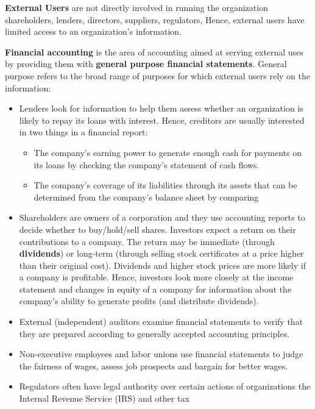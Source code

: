 \documentclass[../main.tex]{subfiles}
\begin{document}
	\textbf{External Users} are not directly involved in running the 
	organization \eg shareholders, lenders, directors, suppliers, regulators, 
	\etc Hence, external users have limited access to an organization's 
	information.
	
	\textbf{Financial accounting} is the area of accounting aimed at serving 
	external uses by providing them with \textbf{general purpose financial 
	statements}. General purpose refers to the broad range of purposes for 
	which external users rely on the information:
	\begin{itemize}[noitemsep]
		\item Lenders look for information to help them assess whether an 
		organization is likely to repay its loans with interest. Hence, 
		creditors are usually interested in two things in a financial report:
		\begin{itemize}[noitemsep]
			\item The company's earning power to generate enough cash for 
			payments on its loans by checking the company's statement of cash 
			flows.
			\item The company's coverage of its liabilities through its assets 
			that can be determined from the company's balance sheet by 
			comparing 
		\end{itemize}
		\item Shareholders are owners of a corporation and they use accounting 
		reports to decide whether to buy/hold/sell shares. Investors expect a 
		return on their contributions to a company. The return may be immediate 
		(through \textbf{dividends}) or long-term (through selling stock 
		certificates at 
		a price higher than their original cost). Dividends and higher stock 
		prices are more likely if a company is profitable. Hence, investors 
		look more closely at the income statement and changes in equity of a 
		company for information about the company's ability to generate profits 
		(and distribute dividends).
		\item External (independent) auditors examine financial statements to 
		verify that they are prepared according to generally accepted 
		accounting principles. 
		\item Non-executive employees and labor unions use financial statements 
		to judge the fairness of wages, assess job prospects and bargain for 
		better wages. 
		\item Regulators often have legal authority over certain actions of 
		organizations \eg the Internal Revenue Service (IRS) and other tax 

\end{itemize}
\end{document}
